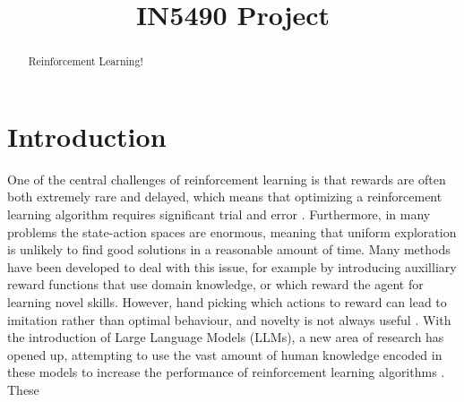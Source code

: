 \documentclass[conference]{IEEEtran}
\begin{document}
\title{IN5490 Project}

\author{
\and
{}
\and
{}
}

\maketitle

\begin{abstract}

Reinforcement Learning!

\end{abstract}

\begin{IEEEkeywords}
\end{IEEEkeywords}

\section{Introduction}

One of the central challenges of reinforcement learning is that rewards are often both extremely rare and delayed, which means that optimizing a reinforcement learning algorithm requires significant trial and error \cite[423]{brunton}. Furthermore, in many problems the state-action spaces are enormous, meaning that uniform exploration is unlikely to find good solutions in a reasonable amount of time. Many methods have been developed to deal with this issue, for example by introducing auxilliary reward functions that use domain knowledge, or which reward the agent for learning novel skills. However, hand picking which actions to reward can lead to imitation rather than optimal behaviour, and novelty is not always useful \cite[2]{ellm}. With the introduction of Large Language Models (LLMs), a new area of research has opened up, attempting to use the vast amount of human knowledge encoded in these models to increase the performance of reinforcement learning algorithms \cite{survey}. These 
\end{document}
